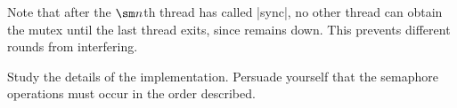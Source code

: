 



Note that after the $\sm n$th thread has called |sync|, no other thread can
obtain the mutex until the last thread exits, since  remains
down.  This prevents different rounds from interfering.

\begin{instruction}
Study the details of the implementation.  Persuade yourself that the semaphore
operations must occur in the order described.
\end{instruction}
